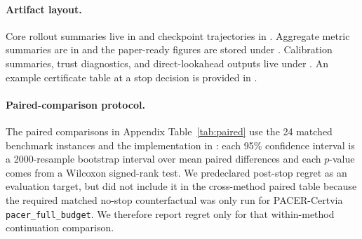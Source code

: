 \documentclass{article}
\newcommand{\method}{PACER-Cert}
\begin{document}
\paragraph{Artifact layout.}
Core rollout summaries live in  and checkpoint trajectories in . Aggregate metric summaries are in  and the paper-ready figures are stored under . Calibration summaries, trust diagnostics, and direct-lookahead outputs live under . An example certificate table at a stop decision is provided in .

\paragraph{Paired-comparison protocol.}
The paired comparisons in Appendix Table~\ref{tab:paired} use the 24 matched benchmark instances and the implementation in : each 95\% confidence interval is a 2000-resample bootstrap interval over mean paired differences and each $p$-value comes from a Wilcoxon signed-rank test. We predeclared post-stop regret as an evaluation target, but did not include it in the cross-method paired table because the required matched no-stop counterfactual was only run for \method via \texttt{pacer\_full\_budget}. We therefore report regret only for that within-method continuation comparison.
\end{document}
